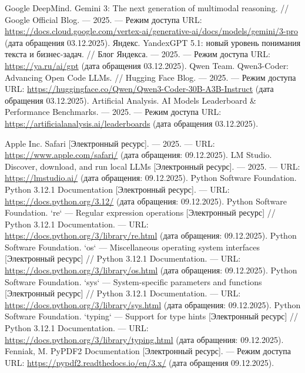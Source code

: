 \begin{thebibliography}{}
	Google DeepMind. Gemini 3: The next generation of multimodal reasoning. // Google Official Blog. --- 2025. --- Режим доступа URL: \url{https://docs.cloud.google.com/vertex-ai/generative-ai/docs/models/gemini/3-pro} (дата обращения 03.12.2025).
	Яндекс. YandexGPT 5.1: новый уровень понимания текста и бизнес-задач. // Блог Яндекса. --- 2025. --- Режим доступа URL: \url{https://ya.ru/ai/gpt} (дата обращения 03.12.2025).
	Qwen Team. Qwen3-Coder: Advancing Open Code LLMs. // Hugging Face Blog. --- 2025. --- Режим доступа URL: \url{https://huggingface.co/Qwen/Qwen3-Coder-30B-A3B-Instruct} (дата обращения 03.12.2025).
	Artificial Analysis. AI Models Leaderboard \& Performance Benchmarks. --- 2025. --- Режим доступа URL: \url{https://artificialanalysis.ai/leaderboards} (дата обращения 03.12.2025).
	
	Apple Inc. Safari [Электронный ресурс]. --- 2025. --- URL: \url{https://www.apple.com/safari/} (дата обращения: 09.12.2025).
	LM Studio. Discover, download, and run local LLMs [Электронный ресурс]. --- 2025. --- URL: \url{https://lmstudio.ai/} (дата обращения: 09.12.2025).
	Python Software Foundation. Python 3.12.1 Documentation [Электронный ресурс]. --- URL: \url{https://docs.python.org/3.12/} (дата обращения: 09.12.2025).
	Python Software Foundation. `re` --- Regular expression operations [Электронный ресурс] // Python 3.12.1 Documentation. --- URL: \url{https://docs.python.org/3/library/re.html} (дата обращения: 09.12.2025).
	Python Software Foundation. `os` --- Miscellaneous operating system interfaces [Электронный ресурс] // Python 3.12.1 Documentation. --- URL: \url{https://docs.python.org/3/library/os.html} (дата обращения: 09.12.2025).
	Python Software Foundation. `sys` --- System-specific parameters and functions [Электронный ресурс] // Python 3.12.1 Documentation. --- URL: \url{https://docs.python.org/3/library/sys.html} (дата обращения: 09.12.2025).
	Python Software Foundation. `typing` --- Support for type hints [Электронный ресурс] // Python 3.12.1 Documentation. --- URL: \url{https://docs.python.org/3/library/typing.html} (дата обращения: 09.12.2025).
	Fenniak, M. PyPDF2 Documentation [Электронный ресурс]. --- Режим доступа URL: \url{https://pypdf2.readthedocs.io/en/3.x/} (дата обращения 09.12.2025).
	
\end{thebibliography}
